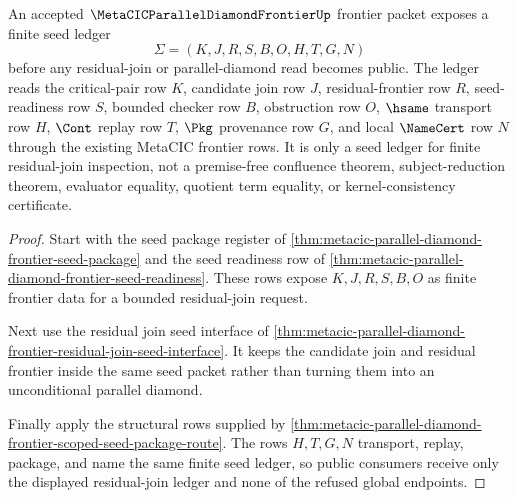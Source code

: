 \begin{theorem}
\label{thm:metacic-parallel-diamond-frontier-seed-ledger}
An accepted $\MetaCICParallelDiamondFrontierUp$ frontier packet exposes a finite seed ledger
$$
\Sigma=(K,J,R,S,B,O,H,T,G,N)
$$
before any residual-join or parallel-diamond read becomes public. The ledger reads the critical-pair row $K$, candidate join row $J$, residual-frontier row $R$, seed-readiness row $S$, bounded checker row $B$, obstruction row $O$, $\hsame$ transport row $H$, $\Cont$ replay row $T$, $\Pkg$ provenance row $G$, and local $\NameCert$ row $N$ through the existing MetaCIC frontier rows. It is only a seed ledger for finite residual-join inspection, not a premise-free confluence theorem, subject-reduction theorem, evaluator equality, quotient term equality, or kernel-consistency certificate.
\end{theorem}
\begin{proof}
Start with the seed package register of \autoref{thm:metacic-parallel-diamond-frontier-seed-package} and the seed readiness row of \autoref{thm:metacic-parallel-diamond-frontier-seed-readiness}. These rows expose $K,J,R,S,B,O$ as finite frontier data for a bounded residual-join request.

Next use the residual join seed interface of \autoref{thm:metacic-parallel-diamond-frontier-residual-join-seed-interface}. It keeps the candidate join and residual frontier inside the same seed packet rather than turning them into an unconditional parallel diamond.

Finally apply the structural rows supplied by \autoref{thm:metacic-parallel-diamond-frontier-scoped-seed-package-route}. The rows $H,T,G,N$ transport, replay, package, and name the same finite seed ledger, so public consumers receive only the displayed residual-join ledger and none of the refused global endpoints.
\end{proof}
